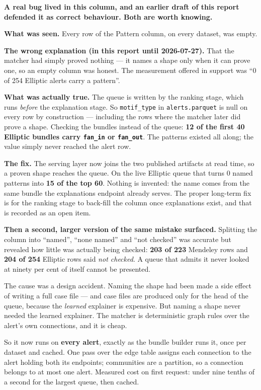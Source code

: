 \documentclass[11pt,a4paper]{article}
\newcommand{\code}[1]{\texttt{\small #1}}
\begin{document}
\begin{warnbox}
\textbf{A real bug lived in this column, and an earlier draft of this report
defended it as correct behaviour. Both are worth knowing.}

\textbf{What was seen.} Every row of the Pattern column, on every dataset, was
empty.

\textbf{The wrong explanation (in this report until 2026-07-27).} That the
matcher had simply proved nothing --- it names a shape only when it can prove
one, so an empty column was honest. The measurement offered in support was
``0 of 254 Elliptic alerts carry a pattern''.

\textbf{What was actually true.} The queue is written by the ranking stage,
which runs \emph{before} the explanation stage. So \code{motif\_type} in
\code{alerts.parquet} is null on every row by construction --- including the
rows where the matcher later did prove a shape. Checking the bundles instead of
the queue: \textbf{12 of the first 40 Elliptic bundles carry \code{fan\_in} or
\code{fan\_out}}. The patterns existed all along; the value simply never reached
the alert row.

\textbf{The fix.} The serving layer now joins the two published artifacts at
read time, so a proven shape reaches the queue. On the live Elliptic queue that
turns 0 named patterns into \textbf{15 of the top 60}. Nothing is invented: the
name comes from the same bundle the explanations endpoint already serves. The
proper long-term fix is for the ranking stage to back-fill the column once
explanations exist, and that is recorded as an open item.

\textbf{Then a second, larger version of the same mistake surfaced.} Splitting
the column into ``named'', ``none named'' and ``not checked'' was accurate but
revealed how little was actually being checked: \textbf{203 of 223} Mendeley
rows and \textbf{204 of 254} Elliptic rows said \emph{not checked}. A queue
that admits it never looked at ninety per cent of itself cannot be presented.

The cause was a design accident. Naming the shape had been made a side effect of
writing a full case file --- and case files are produced only for the head of the
queue, because the \emph{learned} explainer is expensive. But naming a shape
never needed the learned explainer. The matcher is deterministic graph rules
over the alert's own connections, and it is cheap.

So it now runs on \textbf{every alert}, exactly as the bundle builder runs it,
once per dataset and cached. One pass over the edge table assigns each
connection to the alert holding both its endpoints; communities are a partition,
so a connection belongs to at most one alert. Measured cost on first request:
under nine tenths of a second for the largest queue, then cached.


\end{warnbox}
\end{document}
